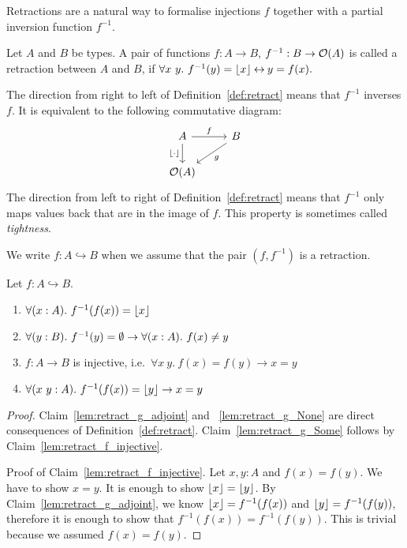 Retractions are a natural way to formalise injections $f$ together with a partial inversion function $f^{-1}$.

\begin{definition}[Retract]
  \label{def:retract}
  Let $A$ and $B$ be types.  A pair of functions $f : A \to B$, $f^{-1} : B \rightarrow \mathcal{O}(A)$ is called a retraction between $A$ and $B$, if
  $ \forall x~y.~f^{-1}(y) = \left\lfloor {x} \right\rfloor \mathbin{\leftrightarrow} y = f(x). $
\end{definition}

The direction from right to left of Definition~\ref{def:retract} means that $f^{-1}$ inverses $f$.  It is equivalent to the following commutative
diagram:
\[
  \begin{tikzcd}
    A \arrow[r, "f"] \arrow[d, "\Some \cdot", swap] & B \arrow[ld, "g"] \\
    \Option(A) &
  \end{tikzcd}
\]
The direction from left to right of Definition~\ref{def:retract} means that $f^{-1}$ only maps values back that are in the image of $f$.  This
property is sometimes called \emph{tightness}.

We write $f : A \hookrightarrow B$ when we assume that the pair $(f, f^{-1})$ is a retraction.


\begin{lemma}
  \label{lem:retracts-basic}
  Let $f : A \hookrightarrow B$.
  \begin{enumerate}
  \item \label{lem:retract_g_adjoint}
    $\forall (x:A).~f^{-1}(f(x)) = \left\lfloor {x} \right\rfloor$
  \item \label{lem:retract_g_None}
    $\forall (y:B).~f^{-1}(y) = \emptyset \rightarrow \forall (x:A).~f(x) \neq y$
  \item \label{lem:retract_f_injective}
    $f : A \to B$ is injective, i.e.\ $\forall x~y.~f(x)=f(y) \rightarrow x=y$
  \item \label{lem:retract_g_Some}
    $\forall (x~y:A).~f^{-1}(f(x)) = \left\lfloor {y} \right\rfloor \rightarrow x=y$
  \end{enumerate}
\end{lemma}

\begin{proof}
  Claim~\ref{lem:retract_g_adjoint} and ~\ref{lem:retract_g_None} are direct consequences of Definition~\ref{def:retract}.
  Claim~\ref{lem:retract_g_Some} follows by Claim~\ref{lem:retract_f_injective}.

  Proof of Claim~\ref{lem:retract_f_injective}.  Let $x, y: A$ and $f(x)=f(y)$.  We have to show $x=y$.  It is enough to show $\left\lfloor {x} \right\rfloor = \left\lfloor {y} \right\rfloor$.  By
  Claim~\ref{lem:retract_g_adjoint}, we know $\left\lfloor {x} \right\rfloor = f^{-1}(f(x))$ and $\left\lfloor {y} \right\rfloor = f^{-1}(f(y))$, therefore it is enough to show that
  $f^{-1}(f(x)) = f^{-1}(f(y))$.  This is trivial because we assumed $f(x)=f(y)$.
\end{proof}

